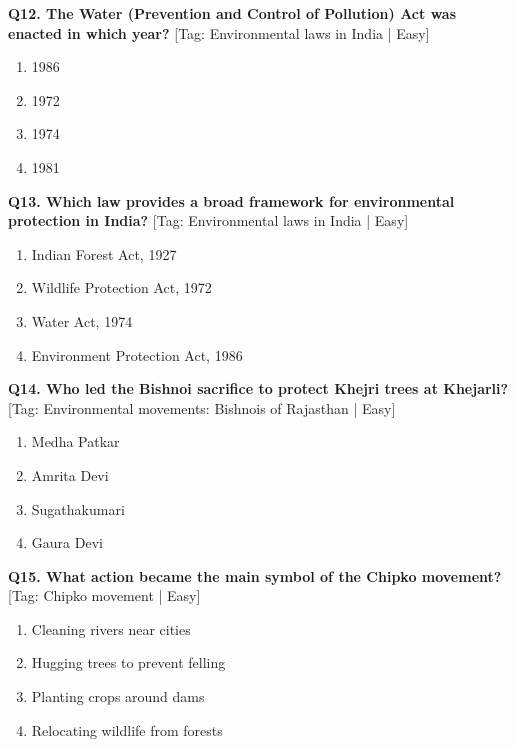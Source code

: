 \noindent\textbf{Q12. The Water (Prevention and Control of Pollution) Act was enacted in which year?} \hfill [Tag: Environmental laws in India | Easy]
\begin{enumerate}[label=(\alph*),topsep=2pt,itemsep=1pt,partopsep=0pt,parsep=0pt]
    \item {1986}
    \item {1972}
    \item {1974}
    \item {1981}
\end{enumerate}
\vspace{2mm}

\noindent\textbf{Q13. Which law provides a broad framework for environmental protection in India?} \hfill [Tag: Environmental laws in India | Easy]
\begin{enumerate}[label=(\alph*),topsep=2pt,itemsep=1pt,partopsep=0pt,parsep=0pt]
    \item {Indian Forest Act, 1927}
    \item {Wildlife Protection Act, 1972}
    \item {Water Act, 1974}
    \item {Environment Protection Act, 1986}
\end{enumerate}
\vspace{2mm}

\noindent\textbf{Q14. Who led the Bishnoi sacrifice to protect Khejri trees at Khejarli?} \hfill [Tag: Environmental movements: Bishnois of Rajasthan | Easy]
\begin{enumerate}[label=(\alph*),topsep=2pt,itemsep=1pt,partopsep=0pt,parsep=0pt]
    \item {Medha Patkar}
    \item {Amrita Devi}
    \item {Sugathakumari}
    \item {Gaura Devi}
\end{enumerate}
\vspace{2mm}

\noindent\textbf{Q15. What action became the main symbol of the Chipko movement?} \hfill [Tag: Chipko movement | Easy]
\begin{enumerate}[label=(\alph*),topsep=2pt,itemsep=1pt,partopsep=0pt,parsep=0pt]
    \item {Cleaning rivers near cities}
    \item {Hugging trees to prevent felling}
    \item {Planting crops around dams}
    \item {Relocating wildlife from forests}
\end{enumerate}
\vspace{2mm}

